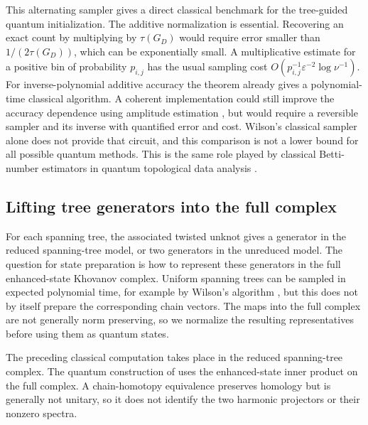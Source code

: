 \documentclass[a4paper,onecolumn,unpublished]{quantumarticle}
\theoremstyle{plain}
\theoremstyle{definition}
\theoremstyle{definition}
\numberwithin{equation}{section}
\begin{document}
This alternating sampler gives a direct classical benchmark for the tree-guided quantum initialization. The additive normalization is essential. Recovering an exact count by multiplying by \(\tau(G_D)\) would require error smaller than \(1/(2\tau(G_D))\), which can be exponentially small. A multiplicative estimate for a positive bin of probability \(p_{i,j}\) has the usual sampling cost \(O(p_{i,j}^{-1}\varepsilon^{-2}\log\nu^{-1})\). For inverse-polynomial additive accuracy the theorem already gives a polynomial-time classical algorithm. A coherent implementation could still improve the accuracy dependence using amplitude estimation \cite{Montanaro2015}, but would require a reversible sampler and its inverse with quantified error and cost. Wilson's classical sampler alone does not provide that circuit, and this comparison is not a lower bound for all possible quantum methods. This is the same role played by classical Betti-number estimators in quantum topological data analysis \cite{ApersBetti2023,SorciBetti2025,GoogleBettiBerry}.

\subsection{Lifting tree generators into the full complex}
\label{rem:alternating-full-chain-separation}

For each spanning tree, the associated twisted unknot gives a generator in the reduced spanning-tree model, or two generators in the unreduced model. The question for state preparation is how to represent these generators in the full enhanced-state Khovanov complex. Uniform spanning trees can be sampled in expected polynomial time, for example by Wilson's algorithm \cite{Wilson96}, but this does not by itself prepare the corresponding chain vectors. The maps into the full complex are not generally norm preserving, so we normalize the resulting representatives before using them as quantum states.

The preceding classical computation takes place in the reduced spanning-tree complex. The quantum construction of  uses the enhanced-state inner product on the full complex. A chain-homotopy equivalence preserves homology but is generally not unitary, so it does not identify the two harmonic projectors or their nonzero spectra.
\end{document}
